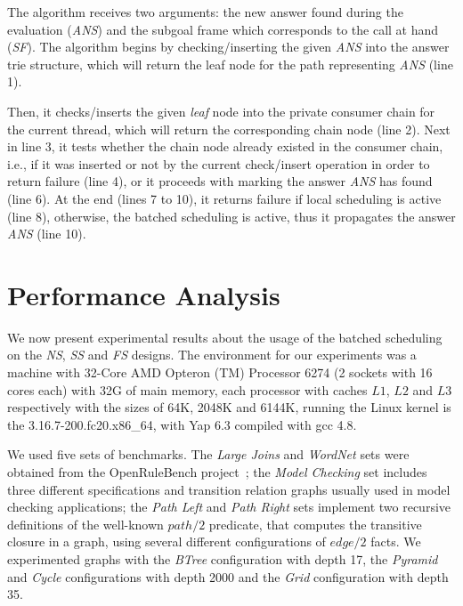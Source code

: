 \documentclass{llncs}
\begin{document}
The algorithm receives two arguments: the new answer found during the
evaluation (\emph{ANS}) and the subgoal frame which corresponds to the
call at hand (\emph{SF}). The algorithm begins by checking/inserting
the given \emph{ANS} into the answer trie structure, which will return
the leaf node for the path representing \emph{ANS} (line 1).

Then, it checks/inserts the given \emph{leaf} node into the private
consumer chain for the current thread, which will return the
corresponding chain node (line 2). Next in line 3, it tests whether
the chain node already existed in the consumer chain, i.e., if it was
inserted or not by the current check/insert operation in order to
return failure (line 4), or it proceeds with marking the answer
\emph{ANS} has found (line 6). At the end (lines 7 to 10), it returns
failure if local scheduling is active (line 8), otherwise, the batched
scheduling is active, thus it propagates the answer \emph{ANS} (line
10).

\section{Performance Analysis}

We now present experimental results about the usage of the batched
scheduling on the \emph{NS}, \emph{SS} and \emph{FS} designs. The
environment for our experiments was a machine with 32-Core AMD Opteron
(TM) Processor 6274 (2 sockets with 16 cores each) with 32G of main
memory, each processor with caches $L1$, $L2$ and $L3$ respectively
with the sizes of 64K, 2048K and 6144K, running the Linux kernel is
the 3.16.7-200.fc20.x86\_64, with Yap 6.3 compiled with gcc 4.8.

We used five sets of benchmarks. The \emph{Large Joins} and
\emph{WordNet} sets were obtained from the OpenRuleBench
project~\cite{Liang-09}; the \emph{Model Checking} set includes three
different specifications and transition relation graphs usually used
in model checking applications; the \emph{Path Left} and \emph{Path
  Right} sets implement two recursive definitions of the well-known
$path/2$ predicate, that computes the transitive closure in a graph,
using several different configurations of $edge/2$ facts. We
experimented graphs with the \emph{BTree} configuration with depth 17,
the \emph{Pyramid} and \emph{Cycle} configurations with depth 2000 and
the \emph{Grid} configuration with depth 35. 
\end{document}
